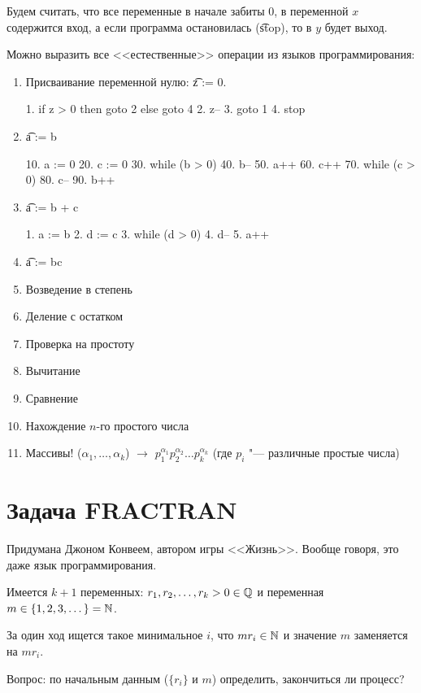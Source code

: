 Будем считать, что все переменные в начале забиты 0, в переменной $x$ содержится вход, а если программа остановилась (\t{stop}), то
в $y$ будет выход.

\begin{exmp}
	Можно выразить все <<естественные>> операции из языков программирования:
	\begin{enumerate}
		\item Присваивание переменной нулю: \t{z := 0}.
		\begin{abstractcode}
1. if z > 0 then goto 2 else goto 4
2. z--
3. goto 1
4. stop    \end{abstractcode}
		\item \t{a := b}
		\begin{abstractcode}
10. a := 0
20. c := 0
30. while (b > 0)
40.     b--
50.     a++
60.     c++
70. while (c > 0)
80.    c--
90.    b++ \end{abstractcode}
	\item \t{a := b + c}
	\begin{abstractcode}
1. a := b
2. d := c
3. while (d > 0)
4.    d--
5.    a++
	\end{abstractcode}
	\item \t{a := bc}
	\item Возведение в степень
	\item Деление с остатком
	\item Проверка на простоту
	\item Вычитание
	\item Сравнение
	\item Нахождение $n$-го простого числа
	\item Массивы! ($\alpha_1, \dots, \alpha_k$) $\rightarrow$ $p_1^{\alpha_1}p_2^{\alpha_2}\dots p_k^{\alpha_k}$ (где $p_i$ "--- различные простые числа)
	\end{enumerate}
\end{exmp} 


\section{Задача FRACTRAN}
Придумана Джоном Конвеем, автором игры <<Жизнь>>.
Вообще говоря, это даже язык программирования.

Имеется $k+1$ переменных: $r_1, r_2, \dots, r_k > 0 \in \mathbb{Q}$ и переменная $m \in \{1, 2, 3, \dots\} = \mathbb{N}$.

За один ход ищется такое минимальное $i$, что $mr_i \in \mathbb{N}$ и значение $m$ заменяется на $mr_i$.

Вопрос: по начальным данным ($\{r_i\}$ и $m$) определить, закончиться ли процесс?

